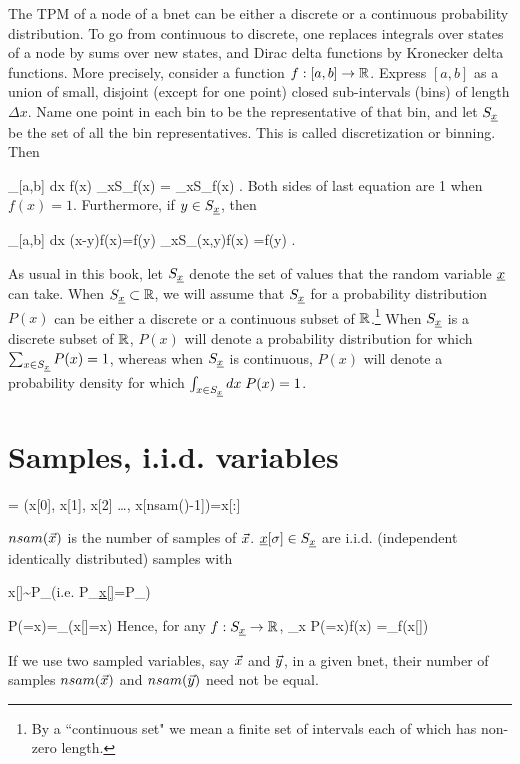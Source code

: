 The TPM of a node
of a bnet can be either a discrete or
a continuous probability distribution.
To go from continuous to discrete, one
replaces integrals over states of a node
 by sums over new states, and Dirac delta
functions by Kronecker delta functions.
 More precisely, consider a function
$f: [a, b]\rightarrow { \mathbb{R}}$. Express
 $[a,b]$ as
a union of
small, disjoint (except for
one point) closed sub-intervals (bins) of
length $\Delta x$.
Name one point
in each bin to be the representative of that bin,
and  let $S_{\underline{x}}$ be the
set of all the bin representatives. This is called
discretization or binning. Then

\beq
{}
\int_{[a,b]} dx \; f(x)\rarrow
{} \sum_{x\in S_\rvx}f(x)
=
 \sum_{x\in S_\rvx}f(x)
 \;.
\eeq
Both sides of last equation are 1 when $f(x)=1$.
 Furthermore, if $y\in S_{\underline{x}}$, then

\beq
\int_{[a,b]} dx \; \delta(x-y)f(x)=f(y)
\rarrow \sum_{x\in S_\rvx}\delta(x,y)f(x)
=f(y)
\;.
\eeq

As usual in this book, let $S_{\underline{x}}$ denote the set of
values that the random variable ${\underline{x}}$ can take.
When $S_{\underline{x}}\subset { \mathbb{R}}$,
we will assume that $S_{\underline{x}}$
for a probability distribution $P(x)$
can be either a discrete or a continuous
subset of ${ \mathbb{R}}$.\footnote{By a ``continuous set" we
mean a finite set of intervals
 each of which has non-zero length.}
When $S_{\underline{x}}$ is a discrete subset of ${ \mathbb{R}}$, $P(x)$
will denote a probability distribution
for which $\sum_{x\in S_{\underline{x}}}P(x)=1$, whereas when
$S_{\underline{x}}$ is continuous, $P(x)$ will denote
a probability density
for which $\int_{x\in S_{\underline{x}}}dx\; P(x)=1$.

\section{Samples,
i.i.d. variables}
\beq
{}= (x[0], x[1], x[2] \ldots,
 x[nsam(\vecx)-1])=x[:]
\eeq

 $nsam({\vec{x}})$ is the number of samples
 of ${\vec{x}}$.
${\underline{x}}[\sigma]\in S_{\underline{x}}$ are
 i.i.d. (independent identically distributed)
samples with

 \beq
x[\sigma]\sim P_\rvx\;\;({\rm i.e.}\; P_{\ul{x[\sigma]}}=P_\rvx)
\eeq

\beq
P(\rvx=x)=\sum_\sigma \indi(x[\sigma]=x)
\eeq
Hence, for any $f:S_{\underline{x}}\rightarrow { \mathbb{R}}$,
\beq
\sum_x P(\rvx=x)f(x)
=\sum_\sigma f(x[\sigma])
\eeq


If we use two sampled variables, say ${\vec{x}}$ and ${\vec{y}}$,
in a given bnet, their number of samples
$nsam({\vec{x}})$ and $nsam({\vec{y}})$ need not be equal.

